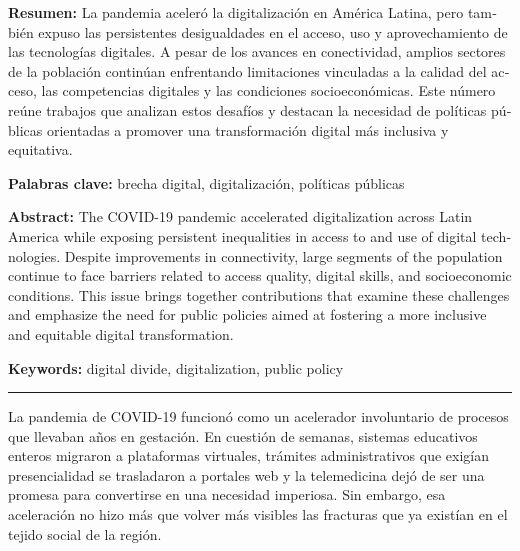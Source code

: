 \documentclass{article}
\begin{document}
\begin{tcolorbox}[colback=brown!8!white,colframe=brown!8!white,boxrule=0pt,arc=2pt,left=4pt,right=4pt,top=3pt,bottom=3pt,before skip=4pt,after skip=4pt]
\begin{otherlanguage}{spanish}
\sffamily\small \textbf{Resumen:} La pandemia aceleró la digitalización en América Latina, pero también expuso las persistentes desigualdades en el acceso, uso y aprovechamiento de las tecnologías digitales. A pesar de los avances en conectividad, amplios sectores de la población continúan enfrentando limitaciones vinculadas a la calidad del acceso, las competencias digitales y las condiciones socioeconómicas. Este número reúne trabajos que analizan estos desafíos y destacan la necesidad de políticas públicas orientadas a promover una transformación digital más inclusiva y equitativa.
\par\smallskip\noindent\textbf{Palabras clave:} brecha digital, digitalización, políticas públicas
\end{otherlanguage}
\end{tcolorbox}

\begin{tcolorbox}[colback=brown!8!white,colframe=brown!8!white,boxrule=0pt,arc=2pt,left=4pt,right=4pt,top=3pt,bottom=3pt,before skip=4pt,after skip=4pt]
\begin{otherlanguage}{english}
\sffamily\small \textbf{Abstract:} The COVID-19 pandemic accelerated digitalization across Latin America while exposing persistent inequalities in access to and use of digital technologies. Despite improvements in connectivity, large segments of the population continue to face barriers related to access quality, digital skills, and socioeconomic conditions. This issue brings together contributions that examine these challenges and emphasize the need for public policies aimed at fostering a more inclusive and equitable digital transformation.
\par\smallskip\noindent\textbf{Keywords:} digital divide, digitalization, public policy
\end{otherlanguage}
\end{tcolorbox}

\bigskip
\noindent\rule{\linewidth}{0.4pt}
\bigskip

La pandemia de COVID-19 funcionó como un acelerador involuntario de procesos que llevaban años en gestación. En cuestión de semanas, sistemas educativos enteros migraron a plataformas virtuales, trámites administrativos que exigían presencialidad se trasladaron a portales web y la telemedicina dejó de ser una promesa para convertirse en una necesidad imperiosa. Sin embargo, esa aceleración no hizo más que volver más visibles las fracturas que ya existían en el tejido social de la región.
\end{document}
